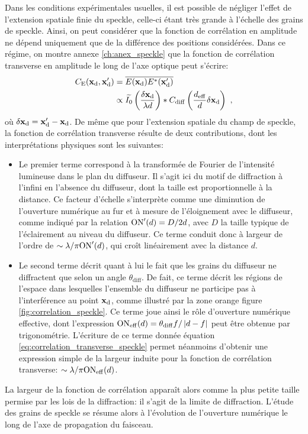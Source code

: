 Dans les conditions expérimentales usuelles, il est possible de négliger l'effet de l'extension spatiale finie du speckle, celle-ci étant très grande à l'échelle des grains de speckle. Ainsi, on peut considérer que la fonction de corrélation en amplitude ne dépend uniquement que de la différence des positions considérées. Dans ce régime, on montre annexe \ref{ch:anex_speckle} que la fonction de corrélation transverse en amplitude le long de l'axe optique peut s'écrire:
\begin{align}
\nonumber C_{\mathrm{E}}(\mathbf{x}_{\mathrm{d}},\mathbf{x}_{\mathrm{d}}') &= \overline{E(\mathbf{x}_{\mathrm{d}}) E^*(\mathbf{x}_{\mathrm{d}}')} \\
& \propto \widetilde{I_0}\left( \frac{\delta\mathbf{x}_{\mathrm{d}}}{\lambda d}\right) \ast C_{\mathrm{diff}}\left( \frac{d_{\mathrm{eff}}}{d} \delta \mathbf{x}_{\mathrm{d}} \right) \text{ ,}
\label{eq:correlation_transverse_speckle}
\end{align}
où $\delta\mathbf{x}_{\mathrm{d}}=\mathbf{x}_{\mathrm{d}}'-\mathbf{x}_{\mathrm{d}}$. De même que pour l'extension spatiale du champ de speckle, la fonction de corrélation transverse résulte de deux contributions, dont les interprétations physiques sont les suivantes:
\begin{itemize}
\item[\textendash] Le premier terme correspond à la transformée de Fourier de l'intensité lumineuse dans le plan du diffuseur. Il s'agit ici du motif de diffraction à l'infini en l'absence du diffuseur, dont la taille est proportionnelle à la distance. Ce facteur d'échelle s'interprète comme une diminution de l'ouverture numérique au fur et à mesure de l'éloignement avec le diffuseur, comme indiqué par la relation $\mathrm{ON}'(d)=D/2d$, avec $D$ la taille typique de l'éclairement au niveau du diffuseur. Ce terme conduit donc à largeur de l'ordre de $\sim\lambda / \pi \mathrm{ON}'(d)$, qui croît linéairement avec la distance $d$. 
\item[\textendash] Le second terme décrit quant à lui le fait que les grains du diffuseur ne diffractent que selon un angle $\theta_{\mathrm{diff}}$. De fait, ce terme décrit les régions de l'espace dans lesquelles l'ensemble du diffuseur ne participe pas à l'interférence au point $\mathbf{x}_{\mathrm{d}}$, comme illustré par la zone orange figure \ref{fig:correlation_speckle}. Ce terme joue ainsi le rôle d'ouverture numérique effective, dont l'expression $\mathrm{ON}_{\mathrm{eff}}(d)=\theta_{\mathrm{diff}} f/\left| d-f \right|$ peut être obtenue par trigonométrie. L'écriture de ce terme donnée équation \ref{eq:correlation_transverse_speckle} permet néanmoins d'obtenir une expression simple de la largeur induite pour la fonction de corrélation transverse: $\sim\lambda /\pi \mathrm{ON}_{\mathrm{eff}} (d)$.
\end{itemize}
La largeur de la fonction de corrélation apparaît alors comme la plus petite taille permise par les lois de la diffraction: il s'agit de la limite de diffraction. L'étude des grains de speckle se résume alors à l'évolution de l'ouverture numérique le long de l'axe de propagation du faisceau.

